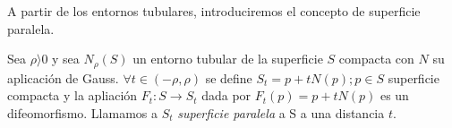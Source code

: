 A partir de los entornos tubulares, introduciremos el concepto de superficie paralela.

\begin{definition}
Sea $\rho  \rangle  0$ y sea $N_\rho(S)$ un entorno tubular de la superficie $S$ compacta con $N$ su aplicación de Gauss. $\forall t \in (-\rho, \rho)$ se define $S_t={p + tN(p); p \in S}$ superficie compacta y la apliación $F_t: S \longrightarrow S_t$ dada por $F_t(p)=p+tN(p)$ es un difeomorfismo.
Llamamos a $S_t$ \textit{superficie paralela} a S a una distancia $t$.
\end{definition}